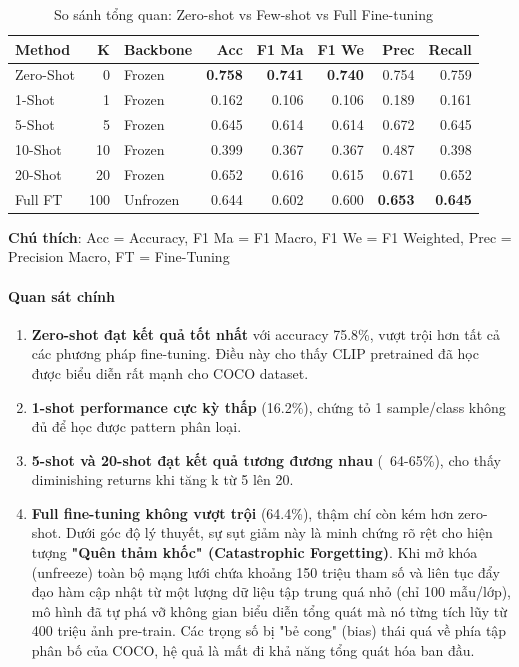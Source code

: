 \begin{table}[H]
    \centering
    \caption{So sánh tổng quan: Zero-shot vs Few-shot vs Full Fine-tuning}
    \begin{tabular}{|l|r|l|r|r|r|r|r|}
        \hline
        \textbf{Method} & \textbf{K} & \textbf{Backbone} & \textbf{Acc} & \textbf{F1 Ma} & \textbf{F1 We} & \textbf{Prec} & \textbf{Recall} \\
        \hline
        Zero-Shot & 0 & Frozen & \textbf{0.758} & \textbf{0.741} & \textbf{0.740} & 0.754 & 0.759 \\
        \hline
        1-Shot & 1 & Frozen & 0.162 & 0.106 & 0.106 & 0.189 & 0.161 \\
        \hline
        5-Shot & 5 & Frozen & 0.645 & 0.614 & 0.614 & 0.672 & 0.645 \\
        \hline
        10-Shot & 10 & Frozen & 0.399 & 0.367 & 0.367 & 0.487 & 0.398 \\
        \hline
        20-Shot & 20 & Frozen & 0.652 & 0.616 & 0.615 & 0.671 & 0.652 \\
        \hline
        Full FT & 100 & Unfrozen & 0.644 & 0.602 & 0.600 & \textbf{0.653} & \textbf{0.645} \\
        \hline
    \end{tabular}
    \label{tab:overall-comparison}
\end{table}

\textbf{Chú thích}: Acc = Accuracy, F1 Ma = F1 Macro, F1 We = F1 Weighted, Prec = Precision Macro, FT = Fine-Tuning

\paragraph{Quan sát chính}
\begin{enumerate}
    \item \textbf{Zero-shot đạt kết quả tốt nhất} với accuracy 75.8\%, vượt trội hơn tất cả các phương pháp fine-tuning. Điều này cho thấy CLIP pretrained đã học được biểu diễn rất mạnh cho COCO dataset.

    \item \textbf{1-shot performance cực kỳ thấp} (16.2\%), chứng tỏ 1 sample/class không đủ để học được pattern phân loại.

    \item \textbf{5-shot và 20-shot đạt kết quả tương đương nhau} (~64-65\%), cho thấy diminishing returns khi tăng k từ 5 lên 20.

    \item \textbf{Full fine-tuning không vượt trội} (64.4\%), thậm chí còn kém hơn zero-shot. Dưới góc độ lý thuyết, sự sụt giảm này là minh chứng rõ rệt cho hiện tượng \textbf{"Quên thảm khốc" (Catastrophic Forgetting)}. Khi mở khóa (unfreeze) toàn bộ mạng lưới chứa khoảng 150 triệu tham số và liên tục đẩy đạo hàm cập nhật từ một lượng dữ liệu tập trung quá nhỏ (chỉ 100 mẫu/lớp), mô hình đã tự phá vỡ không gian biểu diễn tổng quát mà nó từng tích lũy từ 400 triệu ảnh pre-train. Các trọng số bị "bẻ cong" (bias) thái quá về phía tập phân bố của COCO, hệ quả là mất đi khả năng tổng quát hóa ban đầu.
\end{enumerate}

